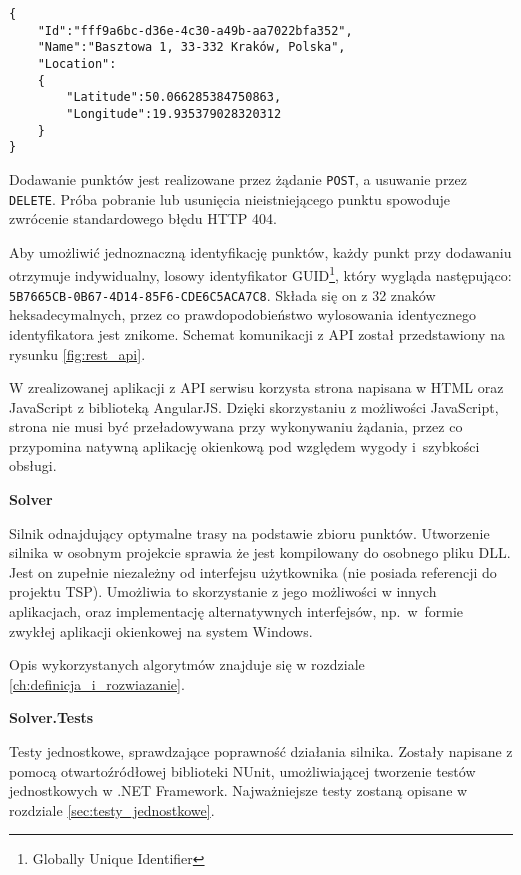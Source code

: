 \begin{verbatim}
{  
    "Id":"fff9a6bc-d36e-4c30-a49b-aa7022bfa352",
    "Name":"Basztowa 1, 33-332 Kraków, Polska",
    "Location": 
    {  
        "Latitude":50.066285384750863,
        "Longitude":19.935379028320312
    }
}
\end{verbatim}

Dodawanie punktów jest realizowane przez żądanie \texttt{POST}, a usuwanie przez \texttt{DELETE}. Próba pobranie lub usunięcia nieistniejącego punktu spowoduje zwrócenie standardowego błędu HTTP 404. 

Aby umożliwić jednoznaczną identyfikację punktów, każdy punkt przy dodawaniu otrzymuje indywidualny, losowy identyfikator GUID\footnote{Globally Unique Identifier}, który wygląda następująco: \texttt{5B7665CB-0B67-4D14-85F6-CDE6C5ACA7C8}. Składa się on z 32 znaków heksadecymalnych, przez co prawdopodobieństwo wylosowania identycznego identyfikatora jest znikome. Schemat komunikacji z API został przedstawiony na rysunku \ref{fig:rest_api}.

W zrealizowanej aplikacji z API serwisu korzysta strona napisana w HTML oraz JavaScript z biblioteką AngularJS. Dzięki skorzystaniu z możliwości JavaScript, strona nie musi być przeładowywana przy wykonywaniu żądania, przez co przypomina natywną aplikację okienkową pod względem wygody i~szybkości obsługi.

\medskip

\noindent \textbf{Solver}

Silnik odnajdujący optymalne trasy na podstawie zbioru punktów. Utworzenie silnika w osobnym projekcie sprawia że jest kompilowany do osobnego pliku DLL. Jest on zupełnie niezależny od interfejsu użytkownika (nie posiada referencji do projektu TSP). Umożliwia to skorzystanie z jego możliwości w innych aplikacjach, oraz implementację alternatywnych interfejsów, np.~w~formie zwykłej aplikacji okienkowej na system Windows.

Opis wykorzystanych algorytmów znajduje się w rozdziale \ref{ch:definicja_i_rozwiazanie}.

\medskip

\noindent \textbf{Solver.Tests}

Testy jednostkowe, sprawdzające poprawność działania silnika. Zostały napisane z pomocą otwartoźródłowej biblioteki NUnit, umożliwiającej tworzenie testów jednostkowych w .NET Framework. Najważniejsze testy zostaną opisane w rozdziale \ref{sec:testy_jednostkowe}.